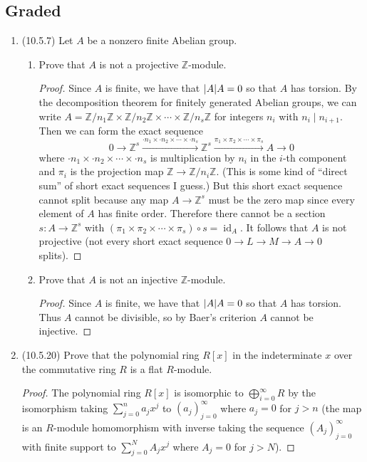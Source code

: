 \documentclass[11pt]{article}
\newcommand{\br}[1]{\left(#1\right)}
\DeclareMathOperator{\id}{id}
\begin{document}
\subsection*{Graded}
\begin{enumerate}
    \item (10.5.7) Let $A$ be a nonzero finite Abelian group. \begin{enumerate}
        \item Prove that $A$ is not a projective $\mathbb{Z}$-module. \begin{proof}
            Since $A$ is finite, we have that $\abs{A}A = 0$ so that $A$ has torsion. By the decomposition theorem for finitely generated Abelian groups, we can write $A = \mathbb{Z}/n_1\mathbb{Z}\times \mathbb{Z}/n_2\mathbb{Z}\times\cdots\times \mathbb{Z}/n_s\mathbb{Z}$ for integers $n_i$ with $n_i\mid n_{i+1}$. Then we can form the exact sequence \[0\to \mathbb{Z}^s\xrightarrow{\cdot n_1\times \cdot n_2\times\cdots\times \cdot n_s}\mathbb{Z}^s\xrightarrow{\pi_1\times \pi_2\times\cdots\times\pi_s} A\to 0\] where $\cdot n_1\times \cdot n_2\times\cdots\times \cdot n_s$ is multiplication by $n_i$ in the $i$-th component and $\pi_i$ is the projection map $\mathbb{Z}\to\mathbb{Z}/n_i\mathbb{Z}$. (This is some kind of ``direct sum'' of short exact sequences I guess.) But this short exact sequence cannot split because any map $A\to\mathbb{Z}^s$ must be the zero map since every element of $A$ has finite order. Therefore there cannot be a section $s\colon A\to \mathbb{Z}^s$ with $(\pi_1\times \pi_2\times\cdots\times\pi_s)\circ s = \id_A$. It follows that $A$ is not projective (not every short exact sequence $0\to L\to M\to A\to 0$ splits).
        \end{proof}
        \item Prove that $A$ is not an injective $\mathbb{Z}$-module. \begin{proof}
            Since $A$ is finite, we have that $\abs{A}A = 0$ so that $A$ has torsion. Thus $A$ cannot be divisible, so by Baer's criterion $A$ cannot be injective.
        \end{proof}
    \end{enumerate}
    \item (10.5.20) Prove that the polynomial ring $R[x]$ in the indeterminate $x$ over the commutative ring $R$ is a flat $R$-module. \begin{proof}
        The polynomial ring $R[x]$ is isomorphic to $\bigoplus_{i=0}^\infty R$ by the isomorphism taking $\sum_{j=0}^n a_jx^j$ to $(a_j)_{j=0}^\infty$ where $a_j = 0$ for $j >n$ (the map is an $R$-module homomorphism with inverse taking the sequence $(A_j)_{j=0}^\infty$ with finite support to $\sum_{j=0}^N A_jx^j$ where $A_j = 0$ for $j>N$). 
        

\end{proof}
\end{enumerate}
\end{document}
